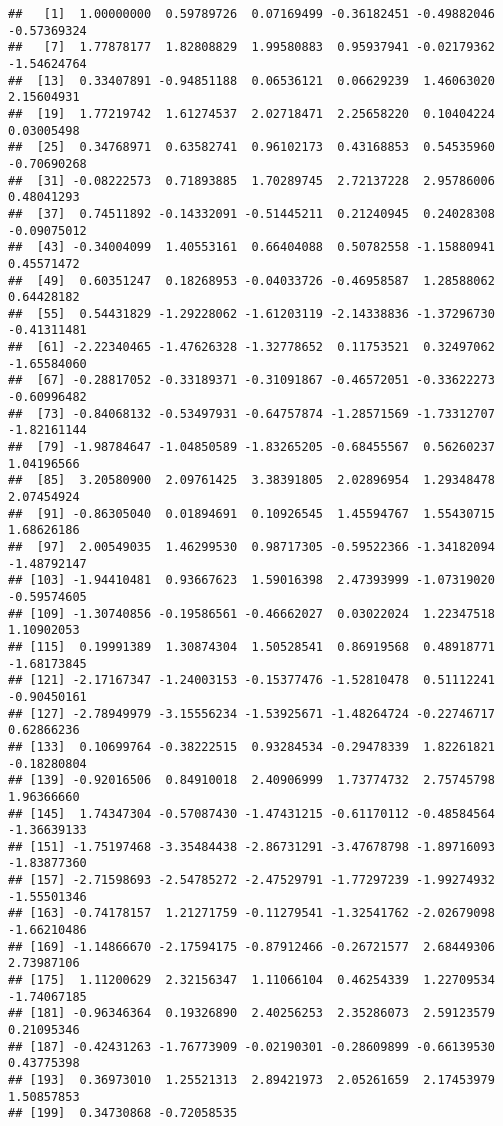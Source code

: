 \documentclass[
]{article}
\begin{document}
\begin{verbatim}
##   [1]  1.00000000  0.59789726  0.07169499 -0.36182451 -0.49882046 -0.57369324
##   [7]  1.77878177  1.82808829  1.99580883  0.95937941 -0.02179362 -1.54624764
##  [13]  0.33407891 -0.94851188  0.06536121  0.06629239  1.46063020  2.15604931
##  [19]  1.77219742  1.61274537  2.02718471  2.25658220  0.10404224  0.03005498
##  [25]  0.34768971  0.63582741  0.96102173  0.43168853  0.54535960 -0.70690268
##  [31] -0.08222573  0.71893885  1.70289745  2.72137228  2.95786006  0.48041293
##  [37]  0.74511892 -0.14332091 -0.51445211  0.21240945  0.24028308 -0.09075012
##  [43] -0.34004099  1.40553161  0.66404088  0.50782558 -1.15880941  0.45571472
##  [49]  0.60351247  0.18268953 -0.04033726 -0.46958587  1.28588062  0.64428182
##  [55]  0.54431829 -1.29228062 -1.61203119 -2.14338836 -1.37296730 -0.41311481
##  [61] -2.22340465 -1.47626328 -1.32778652  0.11753521  0.32497062 -1.65584060
##  [67] -0.28817052 -0.33189371 -0.31091867 -0.46572051 -0.33622273 -0.60996482
##  [73] -0.84068132 -0.53497931 -0.64757874 -1.28571569 -1.73312707 -1.82161144
##  [79] -1.98784647 -1.04850589 -1.83265205 -0.68455567  0.56260237  1.04196566
##  [85]  3.20580900  2.09761425  3.38391805  2.02896954  1.29348478  2.07454924
##  [91] -0.86305040  0.01894691  0.10926545  1.45594767  1.55430715  1.68626186
##  [97]  2.00549035  1.46299530  0.98717305 -0.59522366 -1.34182094 -1.48792147
## [103] -1.94410481  0.93667623  1.59016398  2.47393999 -1.07319020 -0.59574605
## [109] -1.30740856 -0.19586561 -0.46662027  0.03022024  1.22347518  1.10902053
## [115]  0.19991389  1.30874304  1.50528541  0.86919568  0.48918771 -1.68173845
## [121] -2.17167347 -1.24003153 -0.15377476 -1.52810478  0.51112241 -0.90450161
## [127] -2.78949979 -3.15556234 -1.53925671 -1.48264724 -0.22746717  0.62866236
## [133]  0.10699764 -0.38222515  0.93284534 -0.29478339  1.82261821 -0.18280804
## [139] -0.92016506  0.84910018  2.40906999  1.73774732  2.75745798  1.96366660
## [145]  1.74347304 -0.57087430 -1.47431215 -0.61170112 -0.48584564 -1.36639133
## [151] -1.75197468 -3.35484438 -2.86731291 -3.47678798 -1.89716093 -1.83877360
## [157] -2.71598693 -2.54785272 -2.47529791 -1.77297239 -1.99274932 -1.55501346
## [163] -0.74178157  1.21271759 -0.11279541 -1.32541762 -2.02679098 -1.66210486
## [169] -1.14866670 -2.17594175 -0.87912466 -0.26721577  2.68449306  2.73987106
## [175]  1.11200629  2.32156347  1.11066104  0.46254339  1.22709534 -1.74067185
## [181] -0.96346364  0.19326890  2.40256253  2.35286073  2.59123579  0.21095346
## [187] -0.42431263 -1.76773909 -0.02190301 -0.28609899 -0.66139530  0.43775398
## [193]  0.36973010  1.25521313  2.89421973  2.05261659  2.17453979  1.50857853
## [199]  0.34730868 -0.72058535
\end{verbatim}
\end{document}
